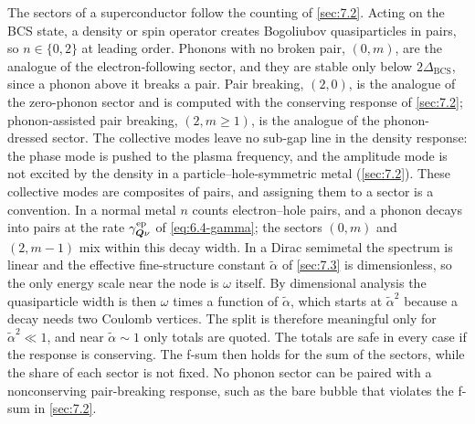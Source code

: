 The sectors of a superconductor follow the counting of \cref{sec:7.2}. Acting on the BCS state, a density or spin operator creates Bogoliubov quasiparticles in pairs, so $n \in \{0, 2\}$ at leading order. Phonons with no broken pair, $(0, m)$, are the analogue of the electron-following sector, and they are stable only below $2\Delta_{\mathrm{BCS}}$, since a phonon above it breaks a pair. Pair breaking, $(2, 0)$, is the analogue of the zero-phonon sector and is computed with the conserving response of \cref{sec:7.2}; phonon-assisted pair breaking, $(2, m \ge 1)$, is the analogue of the phonon-dressed sector. The collective modes leave no sub-gap line in the density response: the phase mode is pushed to the plasma frequency, and the amplitude mode is not excited by the density in a particle--hole-symmetric metal (\cref{sec:7.2}). These collective modes are composites of pairs, and assigning them to a sector is a convention. In a normal metal $n$ counts electron--hole pairs, and a phonon decays into pairs at the rate $\gamma^{\mathrm{ep}}_{\bm{Q}\nu}$ of \cref{eq:6.4-gamma}; the sectors $(0, m)$ and $(2, m - 1)$ mix within this decay width. In a Dirac semimetal the spectrum is linear and the effective fine-structure constant $\tilde\alpha$ of \cref{sec:7.3} is dimensionless, so the only energy scale near the node is $\omega$ itself. By dimensional analysis the quasiparticle width is then $\omega$ times a function of $\tilde\alpha$, which starts at $\tilde\alpha^2$ because a decay needs two Coulomb vertices. The split is therefore meaningful only for $\tilde\alpha^2 \ll 1$, and near $\tilde\alpha \sim 1$ only totals are quoted. The totals are safe in every case if the response is conserving. The f-sum then holds for the sum of the sectors, while the share of each sector is not fixed. No phonon sector can be paired with a nonconserving pair-breaking response, such as the bare bubble that violates the f-sum in \cref{sec:7.2}.

